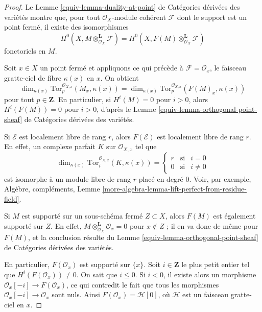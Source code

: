 \begin{proof}
Le Lemme \ref{equiv-lemma-duality-at-point} de Catégories dérivées des
variétés montre que, pour tout $\mathcal{O}_X$-module cohérent
$\mathcal{F}$ dont le support est un point fermé, il existe des
isomorphismes
$$
H^0(X, M \otimes^\mathbf{L}_{\mathcal{O}_X} \mathcal{F}) =
H^0(X, F(M) \otimes^\mathbf{L}_{\mathcal{O}_X} \mathcal{F})
$$
fonctoriels en $M$.

\medskip\noindent
Soit $x \in X$ un point fermé et appliquons ce qui précède à
$\mathcal{F} = \mathcal{O}_x$, le faisceau gratte-ciel de fibre
$\kappa(x)$ en $x$. On obtient
$$
\dim_{\kappa(x)}
\text{Tor}^{\mathcal{O}_{X, x}}_p(M_x, \kappa(x)) =
\dim_{\kappa(x)}
\text{Tor}^{\mathcal{O}_{X, x}}_p(F(M)_x, \kappa(x))
$$
pour tout $p \in \mathbf{Z}$. En particulier, si $H^i(M) = 0$ pour
$i > 0$, alors $H^i(F(M)) = 0$ pour $i > 0$, d'après le Lemme
\ref{equiv-lemma-orthogonal-point-sheaf} de Catégories dérivées des
variétés.

\medskip\noindent
Si $\mathcal{E}$ est localement libre de rang $r$, alors
$F(\mathcal{E})$ est localement libre de rang $r$. En effet, un complexe
parfait $K$ sur $\mathcal{O}_{X, x}$ tel que
$$
\dim_{\kappa(x)} \text{Tor}^{\mathcal{O}_{X, x}}_i(K, \kappa(x)) =
\left\{
\begin{matrix}
r & \text{si} & i = 0 \\
0 & \text{si} & i \not = 0
\end{matrix}
\right.
$$
est isomorphe à un module libre de rang $r$ placé en degré $0$. Voir, par
exemple, Algèbre, compléments, Lemme
\ref{more-algebra-lemma-lift-perfect-from-residue-field}.

\medskip\noindent
Si $M$ est supporté sur un sous-schéma fermé $Z \subset X$, alors $F(M)$
est également supporté sur $Z$. En effet,
$M \otimes_{\mathcal{O}_X}^\mathbf{L} \mathcal{O}_x = 0$ pour
$x \not \in Z$ ; il en va donc de même pour $F(M)$, et la conclusion
résulte du Lemme \ref{equiv-lemma-orthogonal-point-sheaf} de Catégories
dérivées des variétés.

\medskip\noindent
En particulier, $F(\mathcal{O}_x)$ est supporté sur $\{x\}$. Soit
$i \in \mathbf{Z}$ le plus petit entier tel que
$H^i(F(\mathcal{O}_x)) \not = 0$. On sait que $i \leq 0$. Si $i < 0$,
il existe alors un morphisme
$\mathcal{O}_x[-i] \to F(\mathcal{O}_x)$, ce qui contredit le fait que
tous les morphismes $\mathcal{O}_x[-i] \to \mathcal{O}_x$ sont nuls.
Ainsi $F(\mathcal{O}_x) = \mathcal{H}[0]$, où $\mathcal{H}$ est un
faisceau gratte-ciel en $x$.


\end{proof}
